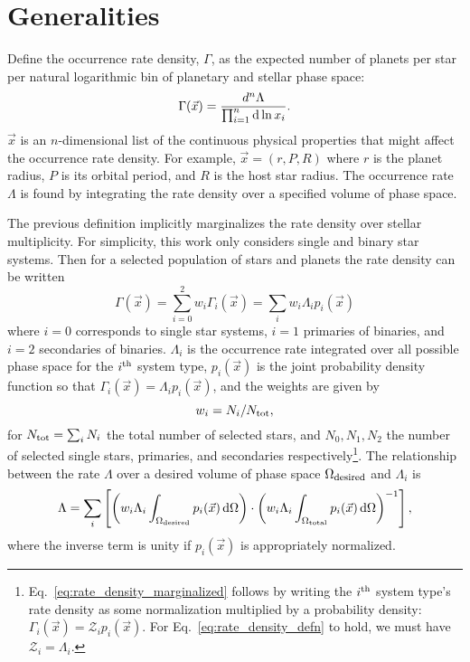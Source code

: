 \section*{Generalities}

Define the occurrence rate density, $\Gamma$,
as the expected number of planets per star per natural logarithmic bin 
of planetary and stellar phase space:
\begin{equation}
\Gamma(\vec{x}) = \frac{d^n\Lambda}{\prod_{i=1}^{n} {\rm d} \ln x_i  }.
\label{eq:rate_density_defn}
\end{equation}
$\vec{x}$ is an $n$-dimensional list of the continuous physical properties 
that might affect the occurrence rate density. 
For example,
$\vec{x}=(r,P,R)$ where $r$ is the planet radius, $P$ is its orbital period, 
and $R$ is the host star radius.
The occurrence rate $\Lambda$ is found by integrating the rate density over a 
specified volume of phase space.


The previous definition implicitly marginalizes the rate density over stellar 
multiplicity.
For simplicity, this work only considers single and binary star systems.
Then for a selected population of stars and planets the rate density can be 
written
\begin{equation}
\Gamma(\vec{x})
= \sum_{i=0}^{2} w_i \Gamma_i(\vec{x})
= \sum_i w_i \Lambda_i p_i(\vec{x})
\label{eq:rate_density_marginalized}
\end{equation}
where $i=0$ corresponds to single star systems, $i=1$ primaries of binaries, 
and $i=2$ secondaries of binaries.
$\Lambda_i$ is the occurrence rate integrated over all possible phase space  
for the $i^{\rm th}$ system type, $p_i(\vec{x})$ is the joint 
probability density function so that $\Gamma_i(\vec{x}) = \Lambda_i 
p_i(\vec{x})$, 
and the weights are given by 
\begin{equation}
w_i = N_i/N_{\rm tot},
\end{equation}
for $N_{\rm tot} = \sum_i N_i$ the total number of selected stars, and 
$N_0,N_1,N_2$ the number of selected single stars, primaries, and 
secondaries respectively\footnote{
Eq.~\ref{eq:rate_density_marginalized} follows by writing the $i^{\rm 
th}$ system type's rate density as some normalization multiplied by a 
probability density:
$\Gamma_i(\vec{x}) = \mathcal{Z}_i p_i(\vec{x})$.
For Eq.~\ref{eq:rate_density_defn} to hold, we must have $\mathcal{Z}_i = 
\Lambda_i$.
}.
The relationship between the rate $\Lambda$ over a desired volume of 
phase space $\Omega_{\rm desired}$ and $\Lambda_i$ is
\begin{equation}
\Lambda = \sum_i
\left[
\left(
w_i \Lambda_i \int_{\Omega_{\rm desired}} p_i(\vec{x}) \,{\rm d}\Omega
\right)
\cdot
\left(
w_i \Lambda_i \int_{\Omega_{\rm total}} p_i(\vec{x}) \,{\rm d}\Omega
\right)^{-1}
\right],
\label{eq:occ_rate}
\end{equation}
where the inverse term is unity if $p_i(\vec{x})$ is appropriately normalized.

